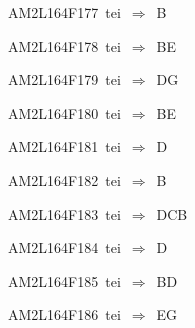 {\sixrm AM2L164F177\ {\sixit tei}\ }$\Rightarrow$\ B\par\smallskip
{\sixrm AM2L164F178\ {\sixit tei}\ }$\Rightarrow$\ BE\par\smallskip
{\sixrm AM2L164F179\ {\sixit tei}\ }$\Rightarrow$\ DG\par\smallskip
{\sixrm AM2L164F180\ {\sixit tei}\ }$\Rightarrow$\ BE\par\smallskip
{\sixrm AM2L164F181\ {\sixit tei}\ }$\Rightarrow$\ D\par\smallskip
{\sixrm AM2L164F182\ {\sixit tei}\ }$\Rightarrow$\ B\par\smallskip
{\sixrm AM2L164F183\ {\sixit tei}\ }$\Rightarrow$\ DCB\par\smallskip
{\sixrm AM2L164F184\ {\sixit tei}\ }$\Rightarrow$\ D\par\smallskip
{\sixrm AM2L164F185\ {\sixit tei}\ }$\Rightarrow$\ BD\par\smallskip
{\sixrm AM2L164F186\ {\sixit tei}\ }$\Rightarrow$\ EG\par\smallskip

